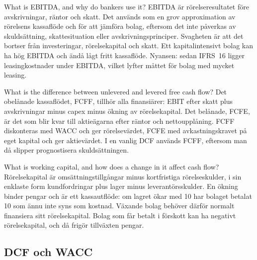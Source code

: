 \begin{fraga}{What is EBITDA, and why do bankers use it?}
EBITDA är rörelseresultatet före avskrivningar, räntor och skatt. Det används som en grov
approximation av rörelsens kassaflöde och för att jämföra bolag, eftersom det inte påverkas av
skuldsättning, skattesituation eller avskrivningsprinciper. Svagheten är att det bortser från
investeringar, rörelsekapital och skatt. Ett kapitalintensivt bolag kan ha hög EBITDA och ändå
lågt fritt kassaflöde. Nyansen: sedan IFRS~16 ligger leasingkostnader under EBITDA, vilket
lyfter måttet för bolag med mycket leasing.
\end{fraga}

\begin{fraga}{What is the difference between unlevered and levered free cash flow?}
Det obelånade kassaflödet, FCFF, tillhör alla finansiärer: EBIT efter skatt plus avskrivningar
minus capex minus ökning av rörelsekapital. Det belånade, FCFE, är det som blir kvar till
aktieägarna efter räntor och nettoupplåning. FCFF diskonteras med WACC och ger rörelsevärdet,
FCFE med avkastningskravet på eget kapital och ger aktievärdet. I en vanlig DCF används FCFF,
eftersom man då slipper prognostisera skuldsättningen.
\end{fraga}

\begin{fraga}{What is working capital, and how does a change in it affect cash flow?}
Rörelsekapital är omsättningstillgångar minus kortfristiga rörelseskulder, i sin enklaste form
kundfordringar plus lager minus leverantörsskulder. En ökning binder pengar och är ett
kassautflöde: om lagret ökar med 10 har bolaget betalat 10 som ännu inte syns som kostnad.
Växande bolag behöver därför normalt finansiera sitt rörelsekapital. Bolag som får betalt i
förskott kan ha negativt rörelsekapital, och då frigör tillväxten pengar.
\end{fraga}

\subsection{DCF och WACC}

